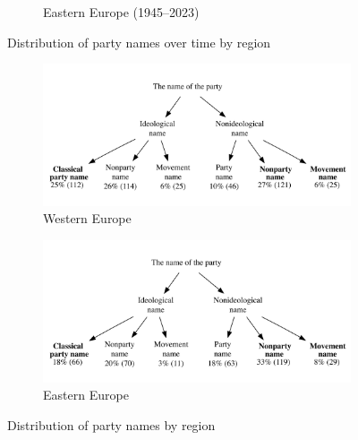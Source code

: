 \documentclass[12pt]{article}
\begin{document}
\begin{figure}[H]
\begin{subfigure}[t]{0.48\textwidth}
  \caption{Eastern Europe (1945--2023)}
\end{subfigure}
\caption{Distribution of party names over time by region}
\end{figure}

\newpage

\begin{figure}[H]
\centering
\begin{subfigure}[t]{0.9\textwidth}
  \includegraphics[width=\textwidth]{./Figures/decision_tree_west.png}
  \caption{Western Europe}
\end{subfigure}
\vspace{0.5em} %
\begin{subfigure}[t]{0.9\textwidth}
  \includegraphics[width=\textwidth]{./Figures/decision_tree_east.png}
  \caption{Eastern Europe}
\end{subfigure}
\caption{Distribution of party names by region}
\end{figure}

\newpage
\end{document}
